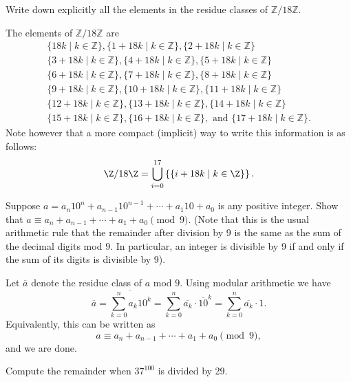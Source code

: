 \begin{questions}
\question
    Write down explicitly all the elements in the residue classes of \(\mathbb{Z} / 18 \mathbb{Z}\).
\begin{solution} The elements of \(\mathbb{Z} / 18 \mathbb{Z}\) are 
    $$\begin{gathered}
        \{18 k \mid k \in \mathbb{Z}\},\{1+18 k \mid k \in \mathbb{Z}\},\{2+18 k \mid k \in \mathbb{Z}\} \\
        \{3+18 k \mid k \in \mathbb{Z}\},\{4+18 k \mid k \in \mathbb{Z}\},\{5+18 k \mid k \in \mathbb{Z}\} \\
        \{6+18 k \mid k \in \mathbb{Z}\},\{7+18 k \mid k \in \mathbb{Z}\},\{8+18 k \mid k \in \mathbb{Z}\} \\
        \{9+18 k \mid k \in \mathbb{Z}\},\{10+18 k \mid k \in \mathbb{Z}\},\{11+18 k \mid k \in \mathbb{Z}\} \\
        \{12+18 k \mid k \in \mathbb{Z}\},\{13+18 k \mid k \in \mathbb{Z}\},\{14+18 k \mid k \in \mathbb{Z}\} \\
        \{15+18 k \mid k \in \mathbb{Z}\},\{16+18 k \mid k \in \mathbb{Z}\},\text{ and }\{17+18 k \mid k \in \mathbb{Z}\}.
        \end{gathered}$$
    Note however that a more compact (implicit) way to write this information is as follows: \[
        \Z/18\Z = \bigcup_{i=0}^{17} \left\{ \{i+18k \mid k\in \Z\} \right\}.
    \]
\end{solution}

\question
    Suppose \(a=a_n 10^n+a_{n-1} 10^{n-1}+\cdots+a_1 10+a_0\) is any positive integer. Show  that \(a \equiv a_n+a_{n-1}+\cdots+a_1+a_0\pmod 9\). (Note that this is the usual arithmetic rule that the remainder after division by 9 is the same as the sum of the decimal digits mod \(9\). In particular, an integer is divisible by 9 if and only if the sum of its digits is divisible by 9).
\begin{theproof}
    Let \(\overline{a}\) denote the residue class of \(a\) mod \(9\). Using modular arithmetic we have 
    \[
        \overline{a}=\overline{\sum_{k=0}^n a_{k} 10^k}=\sum_{k=0}^n{\overline{a_k}}\cdot \overline{10}^k=\sum_{k=0}^n \overline{a_k} \cdot 1.
    \] 
    Equivalently, this can be written as 
    \[a \equiv a_n+a_{n-1}+\cdots+a_1+a_0\pmod 9,\]
    and we are done.
\end{theproof}

\question
    Compute the remainder when \(37^{100}\) is divided by 29.


\end{questions}

